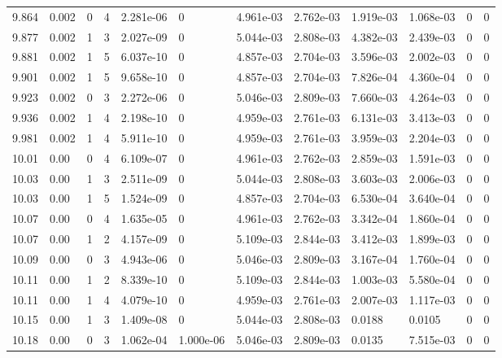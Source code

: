 \documentclass[preview]{standalone}
\begin{document}
{{{{{{{{{{{{{\begin{tabular}{L{1.2cm}C{1.2cm} C{0.3cm}C{0.5cm} C{1.4cm}C{1.4cm} C{1.4cm}C{1.4cm} C{1.6cm}C{1.6cm} C{1.6cm}C{1.6cm}}
  9.864  &  0.002  & 0     &  4 &  2.281e-06  & 0  &  4.961e-03&   2.762e-03& 1.919e-03 & 1.068e-03   &  0 & 0  \\ 
  9.877  &  0.002  & 1     &  3 &  2.027e-09  & 0  &  5.044e-03&   2.808e-03& 4.382e-03 & 2.439e-03   &  0 & 0  \\ 
  9.881  &  0.002  & 1     &  5 &  6.037e-10  & 0  &  4.857e-03&   2.704e-03& 3.596e-03 & 2.002e-03   &  0 & 0  \\ 
  9.901  &  0.002  & 1     &  5 &  9.658e-10  & 0  &  4.857e-03&   2.704e-03& 7.826e-04 & 4.360e-04   &  0 & 0  \\ 
  9.923  &  0.002  & 0     &  3 &  2.272e-06  & 0  &  5.046e-03&   2.809e-03& 7.660e-03 & 4.264e-03   &  0 & 0  \\ 
  9.936  &  0.002  & 1     &  4 &  2.198e-10  & 0  &  4.959e-03&   2.761e-03& 6.131e-03 & 3.413e-03   &  0 & 0  \\ 
  9.981  &  0.002  & 1     &  4 &  5.911e-10  & 0  &  4.959e-03&   2.761e-03& 3.959e-03 & 2.204e-03   &  0 & 0  \\ 
  10.01  &  0.00  & 0     &  4 &  6.109e-07  & 0  &  4.961e-03&   2.762e-03& 2.859e-03 & 1.591e-03   &  0 & 0  \\ 
  10.03  &  0.00  & 1     &  3 &  2.511e-09  & 0  &  5.044e-03&   2.808e-03& 3.603e-03 & 2.006e-03   &  0 & 0  \\ 
  10.03  &  0.00  & 1     &  5 &  1.524e-09  & 0  &  4.857e-03&   2.704e-03& 6.530e-04 & 3.640e-04   &  0 & 0  \\ 
  10.07  &  0.00  & 0     &  4 &  1.635e-05  & 0  &  4.961e-03&   2.762e-03& 3.342e-04 & 1.860e-04   &  0 & 0  \\ 
  10.07  &  0.00  & 1     &  2 &  4.157e-09  & 0  &  5.109e-03&   2.844e-03& 3.412e-03 & 1.899e-03   &  0 & 0  \\ 
  10.09  &  0.00  & 0     &  3 &  4.943e-06  & 0  &  5.046e-03&   2.809e-03& 3.167e-04 & 1.760e-04   &  0 & 0  \\ 
  10.11  &  0.00  & 1     &  2 &  8.339e-10  & 0  &  5.109e-03&   2.844e-03& 1.003e-03 & 5.580e-04   &  0 & 0  \\ 
  10.11  &  0.00  & 1     &  4 &  4.079e-10  & 0  &  4.959e-03&   2.761e-03& 2.007e-03 & 1.117e-03   &  0 & 0  \\ 
  10.15  &  0.00  & 1     &  3 &  1.409e-08  & 0  &  5.044e-03&   2.808e-03& 0.0188 & 0.0105   &  0 & 0  \\ 
  10.18  &  0.00  & 0     &  3 &  1.062e-04  & 1.000e-06  &  5.046e-03&   2.809e-03& 0.0135 & 7.515e-03   &  0 & 0  \\ 

\end{tabular}}}}}}}}}}}}}}
\end{document}

